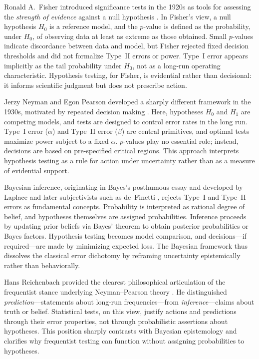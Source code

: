 \medskip

Ronald A.\ Fisher introduced significance tests in the 1920s as tools for assessing the \emph{strength of evidence} against a null hypothesis \cite{fisher_1925_statistical,fisher_1935_design}.  In Fisher’s view, a null hypothesis \(H_0\) is a reference model, and the \(p\)-value is defined as the probability, under \(H_0\), of observing data at least as extreme as those obtained.  Small \(p\)-values indicate discordance between data and model, but Fisher rejected fixed decision thresholds and did not formalize Type~II errors or power.  Type~I error appears implicitly as the tail probability under \(H_0\), not as a long-run operating characteristic.  Hypothesis testing, for Fisher, is evidential rather than decisional: it informs scientific judgment but does not prescribe action.

\medskip

Jerzy Neyman and Egon Pearson developed a sharply different framework in the 1930s, motivated by repeated decision making \cite{pearson_neyman_1933_efficient}.  Here, hypotheses \(H_0\) and \(H_1\) are competing models, and tests are designed to control error rates in the long run.  Type~I error (\(\alpha\)) and Type~II error (\(\beta\)) are central primitives, and optimal tests maximize power subject to a fixed \(\alpha\).  \(p\)-values play no essential role; instead, decisions are based on pre-specified critical regions.  This approach interprets hypothesis testing as a rule for action under uncertainty rather than as a measure of evidential support.

\medskip

Bayesian inference, originating in Bayes’s posthumous essay \cite{bayes_1763_doctrine} and developed by Laplace and later subjectivists such as de~Finetti \cite{definetti_1974_probability}, rejects Type~I and Type~II errors as fundamental concepts.  Probability is interpreted as rational degree of belief, and hypotheses themselves are assigned probabilities.  Inference proceeds by updating prior beliefs via Bayes’ theorem to obtain posterior probabilities or Bayes factors.  Hypothesis testing becomes model comparison, and decisions—if required—are made by minimizing expected loss.  The Bayesian framework thus dissolves the classical error dichotomy by reframing uncertainty epistemically rather than behaviorally.

\medskip

Hans Reichenbach provided the clearest philosophical articulation of the frequentist stance underlying Neyman–Pearson theory \cite{reichenbach_1938_prediction}. He distinguished \emph{prediction}—statements about long-run frequencies—from \emph{inference}—claims about truth or belief.  Statistical tests, on this view, justify actions and predictions through their error properties, not through probabilistic assertions about hypotheses.  This position sharply contrasts with Bayesian epistemology and clarifies why frequentist testing can function without assigning probabilities to hypotheses.


